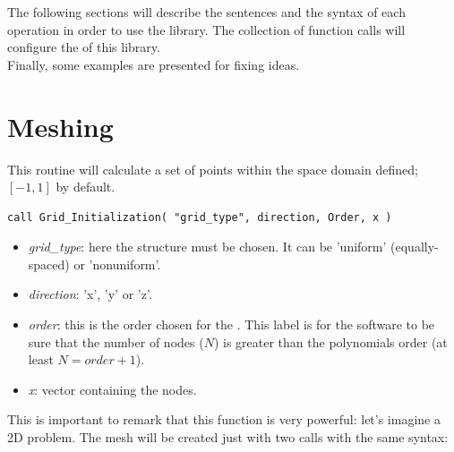 % 
% 


\vspace{0.5cm}

The following sections will describe the sentences and the syntax of each
operation in order to use the library. The collection of function calls will
configure the  of this library.\\

Finally, some examples are presented for fixing ideas. \\

\newpage

\section{Meshing}


This routine will calculate a set of points within the space domain defined;
$[-1,1]$ by default.

\begin{blueframed}
\begin{lstlisting}
call Grid_Initialization( "grid_type", direction, Order, x )
\end{lstlisting}
\end{blueframed}

\begin{itemize}
  \item {\textit{grid\_type}: here the  structure must be chosen. It
  can be 'uniform' (equally-spaced) or 'nonuniform'. }
  \item {\textit{direction}: 'x', 'y' or 'z'.}
  \item {\textit{order}: this is the order chosen for the . This label is for the software to be sure that the number of
  nodes ($N$) is greater than the polynomials order (at least $N= order +1$).
  }
  \item {\textit{x}: vector containing the  nodes.}
\end{itemize}

This is important to remark that this function is very powerful: let's imagine a
2D problem. The mesh will be created just with two calls with the same syntax: 

